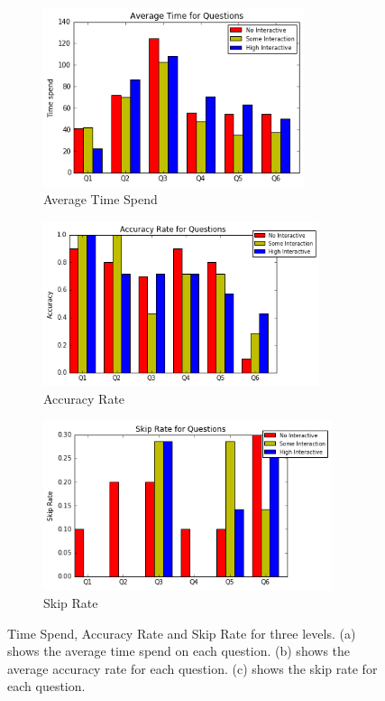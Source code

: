 \documentclass[9pt,journal,compsoc]{IEEEtran}
\begin{document}
\begin{figure} 
  \centering
  \begin{subfigure}{.33\textwidth}
  \centering
  \includegraphics[width=0.84\textwidth]{AverageTimeforMap.PNG}
  \caption{Average Time Spend}
  \label{}
  \end{subfigure}%
  \begin{subfigure}{.33\textwidth}
  \centering
  \includegraphics[width=0.89\textwidth]{AccuracyRateforMap.PNG}
  \caption{Accuracy Rate}
  \label{}
  \end{subfigure}%
  \begin{subfigure}{.33\textwidth}
  \centering
  \includegraphics[width=0.93\textwidth]{SkipRateforMap.PNG}
  \caption{Skip Rate}
  \label{}
  \end{subfigure}
  \parbox{17cm}{\caption{Time Spend, Accuracy Rate and Skip Rate for three levels. (a) shows the average time spend on each question. (b) shows the average accuracy rate for each question. (c) shows the skip rate for each question.}}
\label{fig:1}
\end{figure}
\end{document}
